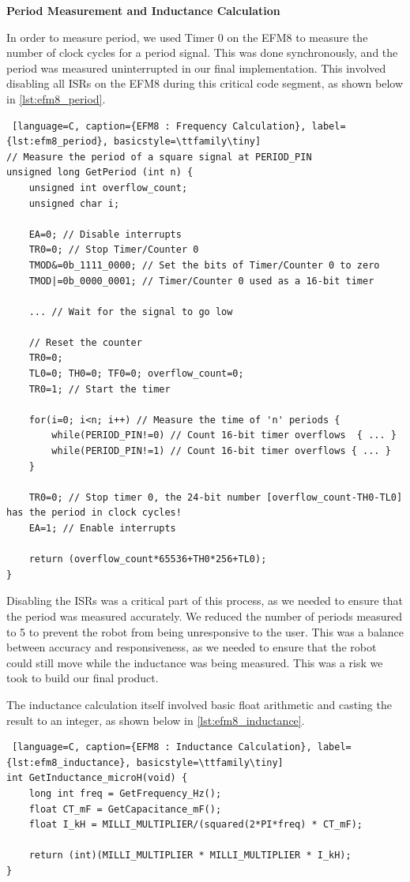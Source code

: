 \documentclass{article}
\begin{document}
\textbf{Period Measurement and Inductance Calculation}

In order to measure period, we used Timer 0 on the EFM8 to measure the number of clock cycles for a period signal.
This was done synchronously, and the period was measured uninterrupted in our final implementation. This involved disabling all ISRs on the EFM8
during this critical code segment, as shown below in \ref{lst:efm8_period}.

\begin{lstlisting} [language=C, caption={EFM8 : Frequency Calculation}, label={lst:efm8_period}, basicstyle=\ttfamily\tiny]
// Measure the period of a square signal at PERIOD_PIN
unsigned long GetPeriod (int n) {
    unsigned int overflow_count;
    unsigned char i;

    EA=0; // Disable interrupts
    TR0=0; // Stop Timer/Counter 0
    TMOD&=0b_1111_0000; // Set the bits of Timer/Counter 0 to zero
    TMOD|=0b_0000_0001; // Timer/Counter 0 used as a 16-bit timer

    ... // Wait for the signal to go low

    // Reset the counter
    TR0=0;
    TL0=0; TH0=0; TF0=0; overflow_count=0;
    TR0=1; // Start the timer

    for(i=0; i<n; i++) // Measure the time of 'n' periods {
        while(PERIOD_PIN!=0) // Count 16-bit timer overflows  { ... }
        while(PERIOD_PIN!=1) // Count 16-bit timer overflows { ... }
    }

    TR0=0; // Stop timer 0, the 24-bit number [overflow_count-TH0-TL0] has the period in clock cycles!
    EA=1; // Enable interrupts

    return (overflow_count*65536+TH0*256+TL0);
}
\end{lstlisting}

Disabling the ISRs was a critical part of this process, as we needed to ensure that the period was measured accurately.
We reduced the number of periods measured to 5 to prevent the robot from being unresponsive to the user. This was a balance between
accuracy and responsiveness, as we needed to ensure that the robot could still move while the inductance was being measured. This was a risk we took
to build our final product.

The inductance calculation itself involved basic float arithmetic and casting the result to an integer, as shown below in \ref{lst:efm8_inductance}.

\begin{lstlisting} [language=C, caption={EFM8 : Inductance Calculation}, label={lst:efm8_inductance}, basicstyle=\ttfamily\tiny]
int GetInductance_microH(void) {
    long int freq = GetFrequency_Hz();
    float CT_mF = GetCapacitance_mF();
	float I_kH = MILLI_MULTIPLIER/(squared(2*PI*freq) * CT_mF);

    return (int)(MILLI_MULTIPLIER * MILLI_MULTIPLIER * I_kH);
}
\end{lstlisting}
\end{document}
